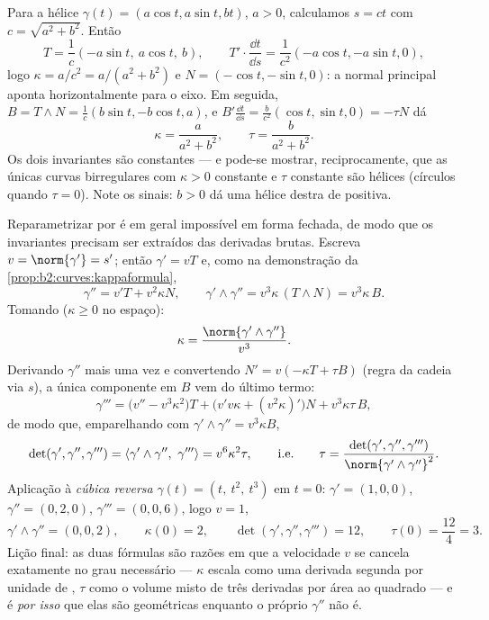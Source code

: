 \begin{example}[A hélice]\label{ex:b2:curves:helixfrenet}
Para a hélice $\gamma(t) = (a\cos t, a\sin t, bt)$, $a > 0$,
calculamos $s = ct$ com $c = \sqrt{a^2 + b^2}$. Então
\[
T = \frac1c(-a\sin t,\ a\cos t,\ b),
\qquad
T' \cdot \frac{\dd t}{\dd s}
= \frac{1}{c^2}(-a\cos t, -a\sin t, 0),
\]
logo $\kappa = a/c^2 = a/(a^2 + b^2)$ e $N = (-\cos t, -\sin t,
0)$: a normal principal aponta horizontalmente para o eixo.
Em seguida, $B = T \wedge N = \frac1c(b\sin t, -b\cos t, a)$, e $B'
\frac{\dd t}{\dd s} = \frac{b}{c^2}(\cos t, \sin t, 0) = -\tau N$
dá
\[
\boxed{\ \kappa = \frac{a}{a^2 + b^2}, \qquad
\tau = \frac{b}{a^2 + b^2}. \ }
\]
Os dois invariantes são constantes --- e pode-se mostrar, reciprocamente, que
as únicas curvas birregulares com $\kappa > 0$ constante e
$\tau$ constante são hélices (círculos quando $\tau = 0$). Note os sinais: $b >
0$ dá uma hélice destra de  positiva.
\end{example}

\begin{example}\label{ex:b2:curves:twistedcubic}
Reparametrizar por  é em geral impossível em forma
fechada, de modo que os invariantes precisam ser extraídos das derivadas
brutas. Escreva $v = \norm{\gamma'} = s'$; então $\gamma' =
vT$ e, como na demonstração da
\cref{prop:b2:curves:kappaformula},
\[
\gamma'' = v'T + v^2\kappa N,
\qquad
\gamma' \wedge \gamma'' = v^3\kappa\,(T \wedge N) =
v^3\kappa\,B .
\]
Tomando  ($\kappa \geq 0$ no espaço):
\[
\kappa = \frac{\norm{\gamma' \wedge \gamma''}}{v^3} .
\]
Derivando $\gamma''$ mais uma vez e convertendo $N' =
v(-\kappa T + \tau B)$ (regra da cadeia via $s$), a única
componente em $B$ vem do último termo:
\[
\gamma''' = \bigl(v'' - v^3\kappa^2\bigr)T +
\bigl(v'v\kappa + (v^2\kappa)'\bigr)N + v^3\kappa\tau\,B,
\]
de modo que, emparelhando com $\gamma' \wedge \gamma'' = v^3\kappa B$,
\[
\det(\gamma', \gamma'', \gamma''') = \langle\gamma' \wedge
\gamma'',\ \gamma'''\rangle = v^6\kappa^2\tau,
\qquad\text{i.e.}\qquad
\tau = \frac{\det(\gamma', \gamma'',
\gamma''')}{\norm{\gamma' \wedge \gamma''}^2} .
\]
Aplicação à \emph{cúbica reversa} $\gamma(t) = (t,\
t^2,\ t^3)$ em $t = 0$: $\gamma' = (1, 0, 0)$, $\gamma'' =
(0, 2, 0)$, $\gamma''' = (0, 0, 6)$, logo $v = 1$,
\[
\gamma' \wedge \gamma'' = (0, 0, 2), \qquad \kappa(0) = 2,
\qquad
\det(\gamma', \gamma'', \gamma''') = 12, \qquad \tau(0) =
\frac{12}{4} = 3 .
\]
Lição final: as duas fórmulas são razões em que a velocidade
$v$ se cancela exatamente no grau necessário --- $\kappa$ escala
como uma derivada segunda por unidade de , $\tau$ como o
volume misto de três derivadas por área ao quadrado --- e é
\emph{por isso} que elas são geométricas enquanto o próprio $\gamma''$ não
é.
\end{example}

